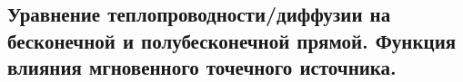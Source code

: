 \subsection{Уравнение теплопроводности/диффузии на бесконечной и полубесконечной прямой. Функция влияния мгновенного точечного источника.}